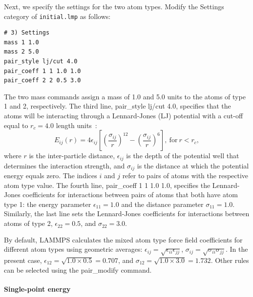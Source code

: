 \documentclass[9pt,tutorial]{livecoms}
\newcommand{\lmpcmd}[1]{\hspace{0pt}\colorbox{listing}{\textcolor{command}{\small{#1}}}\hspace{0pt}} %
\newcommand{\flecmd}[1]{\textcolor{command}{\texttt{#1}}} %
\begin{document}
Next, we specify the settings for the two atom types.  Modify the
\lmpcmd{Settings} category of \flecmd{initial.lmp} as follows:
\begin{lstlisting}
# 3) Settings
mass 1 1.0
mass 2 5.0
pair_style lj/cut 4.0
pair_coeff 1 1 1.0 1.0
pair_coeff 2 2 0.5 3.0
\end{lstlisting}
The two \lmpcmd{mass} commands assign a mass of 1.0 and 5.0 units to the
atoms of type 1 and 2, respectively.  The third line,
\lmpcmd{pair\_style lj/cut 4.0}, specifies that the atoms will be
interacting through a Lennard-Jones (LJ) potential with a cut-off equal
to $r_c = 4.0$ length units~\cite{wang2020lennard,fischer2023history}:
\begin{equation}
E_{ij} (r) = 4 \epsilon_{ij} \left[ \left( \dfrac{\sigma_{ij}}{r} \right)^{12}
  - \left( \dfrac{\sigma_{ij}}{r} \right)^{6} \right], ~ \text{for} ~ r < r_c,
\label{eq:LJ}
\end{equation}
where $r$ is the inter-particle distance, $\epsilon_{ij}$ is the depth
of the potential well that determines the interaction strength, and
$\sigma_{ij}$ is the distance at which the potential energy equals zero.
The indices $i$ and $j$ refer to pairs of atoms {\color{blue} with the
  respective atom type value}.  The fourth line, \lmpcmd{pair\_coeff 1 1
  1.0 1.0}, specifies the Lennard-Jones coefficients for interactions
between pairs of atoms {\color{blue} that both have} atom type 1: the
energy parameter $\epsilon_{11} = 1.0$ and the distance parameter
$\sigma_{11} = 1.0$.  Similarly, the last line sets the Lennard-Jones
coefficients for interactions between atoms of type 2,
$\epsilon_{22} = 0.5$, and $\sigma_{22} = 3.0$.

\begin{note}
  By default, LAMMPS calculates the {\color{blue} mixed atom type} force
  field coefficients for different atom types using geometric averages:
  $\epsilon_{ij} = \sqrt{\epsilon_{ii} \epsilon_{jj}}$,
  $\sigma_{ij} = \sqrt{\sigma_{ii} \sigma_{jj}}$.  In the present case,
  $\epsilon_{12} = \sqrt{1.0 \times 0.5} = 0.707$, and
  $\sigma_{12} = \sqrt{1.0 \times 3.0} = 1.732$. {\color{blue}Other
    rules can be selected using the \lmpcmd{pair\_modify} command.}
\end{note}

\paragraph{Single-point energy}
\end{document}
